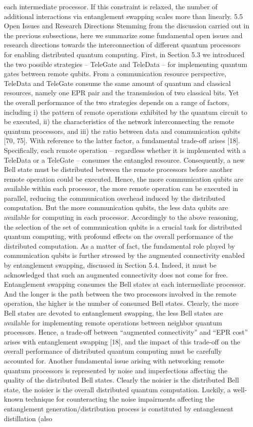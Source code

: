each intermediate processor. If this constraint is relaxed, the number of additional interactions via entanglement swapping scales more than linearly. 5.5 Open Issues and Research Directions Stemming from the discussion carried out in the previous subsections, here we summarize some fundamental open issues and research directions towards the interconnection of different quantum processors for enabling distributed quantum computing. First, in Section 5.3 we introduced the two possible strategies – TeleGate and TeleData – for implementing quantum gates between remote qubits. From a communication resource perspective, TeleData and TeleGate consume the same amount of quantum and classical resources, namely one EPR pair and the transmission of two classical bits. Yet the overall performance of the two strategies depends on a range of factors, including i) the pattern of remote operations exhibited by the quantum circuit to be executed, ii) the characteristics of the network interconnecting the remote quantum processors, and iii) the ratio between data and communication qubits [70, 75]. With reference to the latter factor, a fundamental trade-off arises [18]. Specifically, each remote operation – regardless whether it is implemented with a TeleData or a TeleGate – consumes the entangled resource. Consequently, a new Bell state must be distributed between the remote processors before another remote operation could be executed. Hence, the more communication qubits are available within each processor, the more remote operation can be executed in parallel, reducing the communication overhead induced by the distributed computation. But the more communication qubits, the less data qubits are available for computing in each processor. Accordingly to the above reasoning, the selection of the set of communication qubits is a crucial task for distributed quantum computing, with profound effects on the overall performance of the distributed computation. As a matter of fact, the fundamental role played by communication qubits is further stressed by the augmented connectivity enabled by entanglement swapping, discussed in Section 5.4. Indeed, it must be acknowledged that such an augmented connectivity does not come for free. Entanglement swapping consumes the Bell states at each intermediate processor. And the longer is the path between the two processors involved in the remote operation, the higher is the number of consumed Bell states. Clearly, the more Bell states are devoted to entanglement swapping, the less Bell states are available for implementing remote operations between neighbor quantum processors. Hence, a trade-off between “augmented connectivity” and “EPR cost” arises with entanglement swapping [18], and the impact of this trade-off on the overall performance of distributed quantum computing must be carefully accounted for. Another fundamental issue arising with networking remote quantum processors is represented by noise and imperfections affecting the quality of the distributed Bell states. Clearly the noisier is the distributed Bell state, the noisier is the overall distributed quantum computation. Luckily, a well-known technique for counteracting the noise impairments affecting the entanglement generation/distribution process is constituted by entanglement distillation (also 